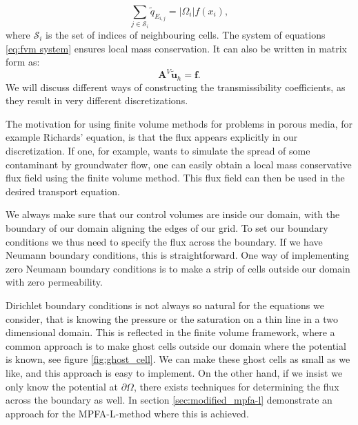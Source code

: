 \documentclass[../Main/main.tex]{subfiles}
\begin{document}
	\begin{equation}\label{eq:fvm system}
		\sum_{j\in \mathcal{S}_i} \tilde{q}_{E_{i,j}} = |\Omega_i|f(x_i),
	\end{equation}
	where $\mathcal{S}_i$ is the set of indices of neighbouring cells.
	The system of equations \eqref{eq:fvm system} ensures local mass conservation. It can also be written in matrix form as:
	\begin{equation}
		\bm{A}^V\tilde{\bm{u}}_h = \bm{f}.
	\end{equation}
	 We will discuss different ways of constructing the transmissibility coefficients, as they result in very different discretizations.
	\par
	The motivation for using finite volume methods for problems in porous media, for example Richards' equation, is that the flux appears explicitly in our discretization. If one, for example, wants to simulate the spread of some contaminant by groundwater flow, one can easily obtain a local mass conservative flux field using the finite volume method. This flux field can then be used in the desired transport equation.
	\par 
	We always make sure that our control volumes are inside our domain, with the boundary of our domain aligning the edges of our grid. To set our boundary conditions we thus need to specify the flux across the boundary. If we have Neumann boundary conditions, this is straightforward. One way of implementing zero Neumann boundary conditions is to make a strip of cells outside our domain with zero permeability. 
	\par
	Dirichlet boundary conditions is not always so natural for the equations we consider, that is knowing the pressure or the saturation on a thin line in a two dimensional domain. This is reflected in the finite volume framework, where a common approach is to make ghost cells outside our domain where the potential is known, see figure \ref{fig:ghost_cell}. We can make these ghost cells as small as we like, and this approach is easy to implement. On the other hand, if we insist we only know the potential at $\partial \Omega$, there exists techniques for determining the flux across the boundary as well. In section \ref{sec:modified_mpfa-l} demonstrate an approach for the MPFA-L-method where this is achieved.
\end{document}
